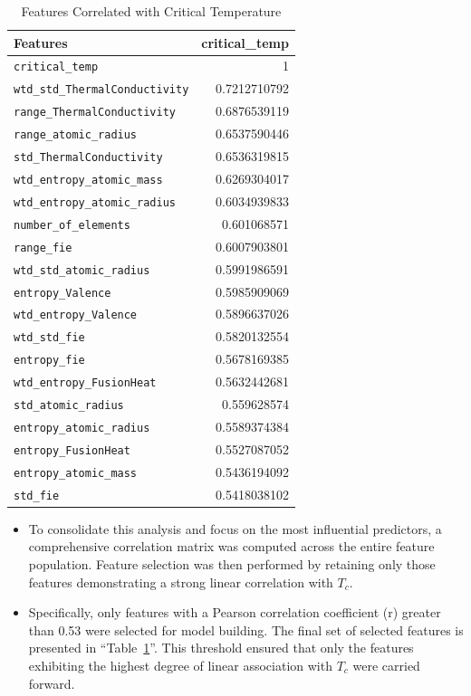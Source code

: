\documentclass[conference]{IEEEtran}
\begin{document}
\begin{table}[h]
	\centering
	\caption{Features Correlated with Critical Temperature}
	\label{WhlCorr}
	\begin{tabular}{|l|r|}
		\hline
		\textbf{Features} & \textbf{critical\_temp} \\
		\hline
		\texttt{critical\_temp} & 1 \\
		\texttt{wtd\_std\_ThermalConductivity} & 0.7212710792 \\
		\texttt{range\_ThermalConductivity} & 0.6876539119 \\
		\texttt{range\_atomic\_radius} & 0.6537590446 \\
		\texttt{std\_ThermalConductivity} & 0.6536319815 \\
		\texttt{wtd\_entropy\_atomic\_mass} & 0.6269304017 \\
		\texttt{wtd\_entropy\_atomic\_radius} & 0.6034939833 \\
		\texttt{number\_of\_elements} & 0.601068571 \\
		\texttt{range\_fie} & 0.6007903801 \\
		\texttt{wtd\_std\_atomic\_radius} & 0.5991986591 \\
		\texttt{entropy\_Valence} & 0.5985909069 \\
		\texttt{wtd\_entropy\_Valence} & 0.5896637026 \\
		\texttt{wtd\_std\_fie} & 0.5820132554 \\
		\texttt{entropy\_fie} & 0.5678169385 \\
		\texttt{wtd\_entropy\_FusionHeat} & 0.5632442681 \\
		\texttt{std\_atomic\_radius} & 0.559628574 \\
		\texttt{entropy\_atomic\_radius} & 0.5589374384 \\
		\texttt{entropy\_FusionHeat} & 0.5527087052 \\
		\texttt{entropy\_atomic\_mass} & 0.5436194092 \\
		\texttt{std\_fie} & 0.5418038102 \\
		\hline
	\end{tabular}
\end{table}
\begin{itemize}
	\item To consolidate this analysis and focus on the most influential predictors, a comprehensive correlation matrix was computed across the entire feature population. Feature selection was then performed by retaining only those features demonstrating a strong linear correlation with $T_c$.
	\item Specifically, only features with a Pearson correlation coefficient (r) greater than 0.53 were selected for model building. The final set of selected features is presented in ``Table~\ref{WhlCorr}''. This threshold ensured that only the features exhibiting the highest degree of linear association with $T_c$ were carried forward.\\
\end{itemize}
\end{document}
